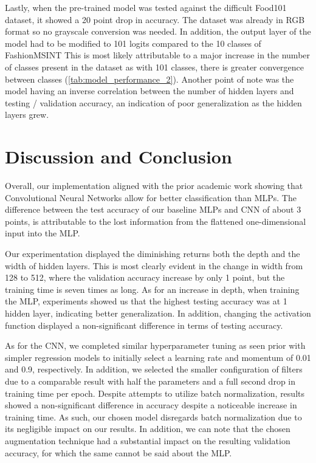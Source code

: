 \documentclass[11pt]{article}
\begin{document}
Lastly, when the pre-trained model was tested against the difficult Food101 dataset, it showed a 20 point drop in accuracy. The dataset was already in RGB format so no grayscale conversion was needed. In addition, the output layer of the model had to be modified to 101 logits compared to the 10 classes of FashionMSINT This is most likely attributable to a major increase in the number of classes present in the dataset as with 101 classes, there is greater convergence between classes (\ref{tab:model_performance_2}). Another point of note was the model having an inverse correlation between the number of hidden layers and testing / validation accuracy, an indication of poor generalization as the hidden layers grew.

\section{Discussion and Conclusion}
Overall, our implementation aligned with the prior academic work showing that Convolutional Neural Networks allow for better classification than MLPs. The difference between the test accuracy of our baseline MLPs and CNN of about 3 points, is attributable to the lost information from the flattened one-dimensional input into the MLP. 

Our experimentation displayed the diminishing returns both the depth and the width of hidden layers. This is most clearly evident in the change in width from 128 to 512, where the validation accuracy increase by only 1 point, but the training time is seven times as long. As for an increase in depth, when training the MLP, experiments showed us that the highest testing accuracy was at 1 hidden layer, indicating better generalization. In addition, changing the activation function displayed a non-significant difference in terms of testing accuracy. 


As for the CNN, we completed similar hyperparameter tuning as seen prior with simpler regression models to initially select a learning rate and momentum of 0.01 and 0.9, respectively. In addition, we selected the smaller configuration of filters due to a comparable result with half the parameters and a full second drop in training time per epoch. Despite attempts to utilize batch normalization, results showed a non-significant difference in accuracy despite a noticeable increase in training time. As such, our chosen model disregards batch normalization due to its negligible impact on our results. In addition, we can note that the chosen augmentation technique had a substantial impact on the resulting validation accuracy, for which the same cannot be said about the MLP.
\end{document}

